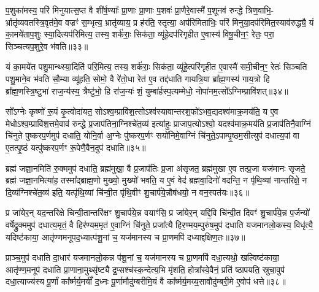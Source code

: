 प॒शुका॑मस्य॒ परि॑ मिनुयात्स॒प्त वै शी॑र्\mbox{}ष॒ण्याः᳚ प्रा॒णाः प्रा॒णाः प॒शवः॑ प्रा॒णैरे॒वास्मै॑ प॒शूनव॑ रुन्द्धे त्रिण॒वाभि॒- र्भ्रातृ॑व्यवतस्त्रि॒वृत॑मे॒व वज्रꣳ॑ स॒म्भृत्य॒ भ्रातृ॑व्याय॒ प्र ह॑रति॒ स्तृत्या॒ अप॑रिमिताभिः॒ परि॑ मिनुया॒दप॑रिमित॒स्याव॑रुद्ध्यै॒ यं का॒मये॑ताप॒शुः स्या॒दित्यप॑रिमित्य॒ तस्य॒ शर्क॑राः॒ सिक॑ता॒ व्यू॑हे॒दप॑रिगृहीत ए॒वास्य॑ विषू॒चीन॒ꣳ॒ रेतः॒ परा॒ सिञ्चत्यप॒शुरे॒व भ॑वति॥३३॥

यं का॒मये॑त पशु॒मान्थ्स्या॒दिति॑ परि॒मित्य॒ तस्य॒ शर्क॑राः॒ सिक॑ता॒ व्यू॑हे॒त्परि॑गृहीत ए॒वास्मै॑ समी॒चीन॒ꣳ॒ रेतः॑ सिञ्चति पशु॒माने॒व भ॑वति सौ॒म्या व्यू॑हति॒ सोमो॒ वै रे॑तो॒धा रेत॑ ए॒व तद्द॑धाति गायत्रि॒या ब्रा᳚ह्म॒णस्य॑ गाय॒त्रो हि ब्रा᳚ह्म॒णस्त्रि॒ष्टुभा॑ राज॒न्य॑स्य॒ त्रैष्टु॑भो॒ हि रा॑ज॒न्यः॑ शं॒ युम्बा॑र्\mbox{}हस्प॒त्यम्मेधो॒ नोपा॑नम॒त्सो᳚\-ऽग्निम्प्रावि॑शत्॥३४॥

सो᳚\-ऽग्नेः कृष्णो॑ रू॒पं कृ॒त्वोदा॑यत॒ सो\-ऽश्व॒म्प्रावि॑श॒त्सो\-ऽश्व॑स्यावान्तरश॒फो॑\-ऽभव॒द्यदश्व॑माक्र॒मय॑ति॒ य ए॒व मेधो\-ऽश्व॒म्प्रावि॑श॒त्तमे॒वाव॑ रुन्द्धे प्र॒जाप॑तिना॒ग्निश्चे॑त॒व्य॑ इत्या॑हुः प्राजाप॒त्यो\-ऽश्वो॒ यदश्व॑माक्र॒मय॑ति प्र॒जाप॑तिनै॒वाग्निं चि॑नुते पुष्करप॒र्णमुप॑ दधाति॒ योनि॒र्वा अ॒ग्नेः पु॑ष्करप॒र्णꣳ सयो॑निमे॒वाग्निं चि॑नुते॒\-ऽपाम्पृ॒ष्ठम॒सीत्युप॑ दधात्य॒पां वा ए॒तत्पृ॒ष्ठं यत्पु॑ष्करप॒र्णꣳ रू॒पेणै॒वैन॒दुप॑ दधाति॥३५॥

{\anuvakamend[{इन्द्रः॑ प॒शुका॑मस्य भवत्यविश॒थ्सयो॑निं विꣳश॒तिश्च॑॥६॥}]}

ब्रह्म॑ जज्ञा॒नमिति॑ रु॒क्ममुप॑ दधाति॒ ब्रह्म॑मुखा॒ वै प्र॒जाप॑तिः प्र॒जा अ॑सृजत॒ ब्रह्म॑मुखा ए॒व तत्प्र॒जा यज॑मानः सृजते॒ ब्रह्म॑ जज्ञा॒नमित्या॑ह॒ तस्मा᳚द्ब्राह्म॒णो मुख्यो॒ मुख्यो॑ भवति॒ य ए॒वं वेद॑ ब्रह्मवा॒दिनो॑ वदन्ति॒ न पृ॑थि॒व्यां नान्तरि॑क्षे॒ न दि॒व्य॑ग्निश्चे॑त॒व्य॑ इति॒ यत्पृ॑थि॒व्यां चि॑न्वी॒त पृ॑थि॒वीꣳ शु॒चार्प॑ये॒न्नौष॑धयो॒ न वन॒स्पत॑यः॥३६॥

प्र जा॑येर॒न् यद॒न्तरि॑क्षे चिन्वी॒तान्तरि॑क्षꣳ शु॒चार्प॑ये॒न्न वयाꣳ॑सि॒ प्र जा॑येर॒न् यद्दि॒वि चि॑न्वी॒त दिवꣳ॑ शु॒चार्प॑ये॒न्न प॒र्जन्यो॑ वर्\mbox{}षेद्रु॒क्ममुप॑ दधात्य॒मृतं॒ वै हिर॑ण्यम॒मृत॑ ए॒वाग्निं चि॑नुते॒ प्रजा᳚त्यै हिर॒ण्मय॒म्पुरु॑ष॒मुप॑ दधाति यजमानलो॒कस्य॒ विधृ॑त्यै॒ यदिष्ट॑काया॒ आतृ॑ण्णमनूपद॒ध्यात्प॑शू॒नां च॒ यज॑मानस्य च प्रा॒णमपि॑ दध्याद्दक्षिण॒तः॥३७॥

प्राञ्च॒मुप॑ दधाति दा॒धार॑ यजमानलो॒कन्न प॑शू॒नां च॒ यज॑मानस्य च प्रा॒णमपि॑ दधा॒त्यथो॒ खल्विष्ट॑काया॒ आतृ॑ण्ण॒मनूप॑ दधाति प्रा॒णाना॒मुथ्सृ॑ष्ट्यै द्र॒प्सश्च॑स्क॒न्देत्य॒भि मृ॑शति॒ होत्रा᳚स्वे॒वैनं॒ प्रति॑ ष्ठापयति॒ स्रुचा॒वुप॑ दधा॒त्याज्य॑स्य पू॒र्णां का᳚र्ष्मर्य॒मयीं᳚ द॒ध्नः पू॒र्णामौदु॑म्बरीमि॒यं वै का᳚र्ष्मर्य॒मय्य॒सावौदु॑म्बरी॒मे ए॒वोप॑ धत्ते॥३८॥

